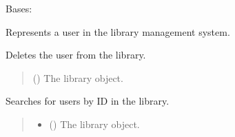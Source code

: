 \documentclass[letterpaper,10pt,english,openany,oneside]{sphinxmanual}
\begin{document}
\begin{fulllineitems}
\label{\detokenize{user:user.User}}
\pysigstartsignatures
{}
\pysigstopsignatures
\sphinxAtStartPar
Bases: 

\sphinxAtStartPar
Represents a user in the library management system.

\begin{fulllineitems}
\label{\detokenize{user:user.User.delete}}
\pysigstartsignatures
{}
\pysigstopsignatures
\sphinxAtStartPar
Deletes the user from the library.
\begin{quote}\begin{description}
\sphinxAtStartPar
{} ({\hyperref[\detokenize{library:library.Library}]{}}) \textendash{} The library object.

\end{description}\end{quote}

\end{fulllineitems}


\begin{fulllineitems}
\label{\detokenize{user:user.User.search_by_id}}
\pysigstartsignatures
{}
\pysigstopsignatures
\sphinxAtStartPar
Searches for users by ID in the library.
\begin{quote}\begin{description}
\begin{itemize}
\item {} 
\sphinxAtStartPar
{} ({\hyperref[\detokenize{library:library.Library}]{}}) \textendash{} The library object.


\end{itemize}
\end{description}
\end{quote}
\end{fulllineitems}
\end{fulllineitems}
\end{document}
